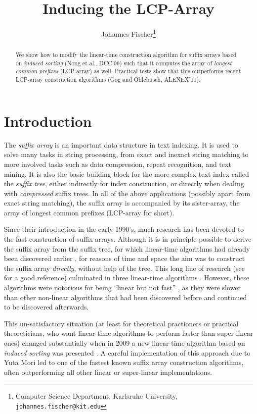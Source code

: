 \documentclass[11pt,onecolumn,final]{article} \usepackage[latin1]{inputenc}
\title{Inducing the LCP-Array}
\author{
Johannes Fischer\thanks{Computer Science Department, Karlsruhe
    University, \texttt{johannes.fischer@kit.edu}}
}
\date{}
\theoremstyle{plain}
\theoremstyle{remark}
\begin{document}
\maketitle

\begin{abstract}
We show how to modify the linear-time construction algorithm for suffix arrays based on \emph{induced sorting} (Nong et al., DCC'09) such that it computes the array of \emph{longest common prefixes} (LCP-array) as well. Practical tests show that this outperforms recent LCP-array construction algorithms (Gog and Ohlebusch, ALENEX'11).
\end{abstract}

\section{Introduction}
The \emph{suffix array} is an important data structure in text indexing. It is used to solve many tasks in string processing, from exact and inexact string matching to more involved tasks such as data compression, repeat recognition, and text mining. It is also the basic building block for the more complex text index called the \emph{suffix tree}, either indirectly for index construction, or directly when dealing with \emph{compressed} suffix trees. In all of the above applications (possibly apart from exact string matching), the suffix array is accompanied by its sister-array, the array of longest common prefixes (LCP-array for short).

Since their introduction in the early 1990's, much research has been devoted to the fast construction of suffix arrays. Although it is in principle possible to derive the suffix array from the suffix tree, for which linear-time algorithms had already been discovered earlier \cite{weiner73linear}, for reasons of time and space the aim was to construct the suffix array \emph{directly}, without help of the tree. This long line of research (see \cite{puglisi07taxonomy} for a good reference) culminated in three linear-time algorithms \cite{kaerkkaeinen06linear,ko05space,kim05constructing}. However, these algorithms were notorious for being ``linear but not fast'' \cite{antonitio04new}, as they were slower than other non-linear algorithms that had been discovered before and continued to be discovered afterwards.

This un-satisfactory situation (at least for theoretical practioners or practical theoreticians, who want linear-time algorithms to perform faster than super-linear ones) changed substantially when in 2009 a new linear-time algorithm based on \emph{induced sorting} was presented \cite{nong09linear}. A careful implementation of this approach due to Yuta Mori led to one of the fastest known suffix array construction algorithms, often outperforming all other linear or super-linear implementations.
\end{document}
